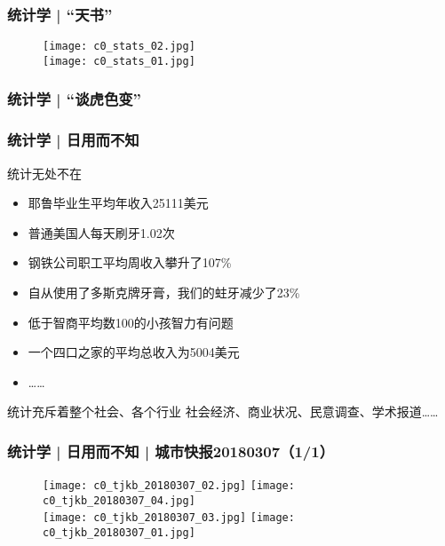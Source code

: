 \begin{frame}
  \frametitle{统计学 | “天书”}
  \begin{figure}
    \centering
    \texttt{[image: c0\_stats\_02.jpg]}\\
    \texttt{[image: c0\_stats\_01.jpg]}
  \end{figure}
\end{frame}

\begin{frame}
  \frametitle{统计学 | “谈虎色变”}
  \begin{figure}
    \centering
  \end{figure}
\end{frame}

\begin{frame}[fragile]
  \frametitle{统计学 | 日用而不知}
  \begin{block}{统计无处不在}
    \begin{itemize}
      \item 耶鲁毕业生平均年收入25111美元 
      \item 普通美国人每天刷牙1.02次
      \item 钢铁公司职工平均周收入攀升了107\%
      \item 自从使用了多斯克牌牙膏，我们的蛀牙减少了23\%
      \item 低于智商平均数100的小孩智力有问题
      \item 一个四口之家的平均总收入为5004美元
      \item ……
    \end{itemize}
  \end{block}
  \pause
  \begin{block}{统计充斥着整个社会、各个行业}
    社会经济、商业状况、民意调查、学术报道……
  \end{block}
\end{frame}

\begin{frame}
  \frametitle{统计学 | 日用而不知 | 城市快报20180307（1/1）}
  \begin{figure}
    \centering
    \texttt{[image: c0\_tjkb\_20180307\_02.jpg]}\quad
    \texttt{[image: c0\_tjkb\_20180307\_04.jpg]}\\
    \texttt{[image: c0\_tjkb\_20180307\_03.jpg]}\quad
    \texttt{[image: c0\_tjkb\_20180307\_01.jpg]}\\
  \end{figure}
\end{frame}

